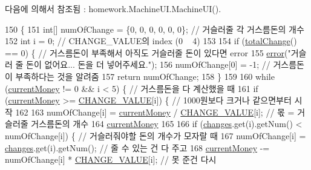 다음에 의해서 참조됨 \+:  homework.\+Machine\+U\+I.\+Machine\+U\+I().


\begin{DoxyCode}
150                                 \{
151         \textcolor{keywordtype}{int}[] numOfChange = \{0, 0, 0, 0, 0, 0\}; \textcolor{comment}{// 거슬러줄 각 거스름돈의 개수}
152         \textcolor{keywordtype}{int} i = 0; \textcolor{comment}{// CHANGE\_VALUE의 index (0 ~ 4)}
153         
154         \textcolor{keywordflow}{if} (\hyperlink{classhomework_1_1_machine_a6871460a79f45dda54336ec2a4554550}{totalChange}() == 0) \{ \textcolor{comment}{// 거스름돈이 부족해서 아직도 거슬러줄 돈이 있다면 error}
155             \hyperlink{classhomework_1_1_machine_a1d7f4ae53f4a73b94c1f7948637abe56}{error}(\textcolor{stringliteral}{"거슬러 줄 돈이 없어요... 돈을 더 넣어주세요."});
156             numOfChange[0] = -1; \textcolor{comment}{// 거스름돈이 부족하다는 것을 알려줌}
157             \textcolor{keywordflow}{return} numOfChange;
158         \}
159         
160         \textcolor{keywordflow}{while} (\hyperlink{classhomework_1_1_machine_a79f249f2701117b1e20977785536dad1}{currentMoney} != 0 && i < 5) \{ \textcolor{comment}{// 거스름돈을 다 계산했을 때}
161             \textcolor{keywordflow}{if} (\hyperlink{classhomework_1_1_machine_a79f249f2701117b1e20977785536dad1}{currentMoney} >= \hyperlink{classhomework_1_1_machine_ab52b84064804f444c66656c109a17ce0}{CHANGE\_VALUE}[i]) \{ \textcolor{comment}{// 1000원보다 크거나 같으면부터 시작}
162                 
163                 numOfChange[i] = \hyperlink{classhomework_1_1_machine_a79f249f2701117b1e20977785536dad1}{currentMoney} / \hyperlink{classhomework_1_1_machine_ab52b84064804f444c66656c109a17ce0}{CHANGE\_VALUE}[i]; \textcolor{comment}{// 몫 = 거슬러줄 거스름돈의
       개수}
164                 \hyperlink{classhomework_1_1_machine_a79f249f2701117b1e20977785536dad1}{currentMoney} %
165                 
166                 \textcolor{keywordflow}{if} (\hyperlink{classhomework_1_1_machine_a48e377022719ab86eb778519dfc46a32}{changes}.get(i).getNum() < numOfChange[i])    \{ \textcolor{comment}{// 거슬러줘야할 돈의 개수가 모자랄 때}
167                     numOfChange[i] = \hyperlink{classhomework_1_1_machine_a48e377022719ab86eb778519dfc46a32}{changes}.get(i).getNum(); \textcolor{comment}{// 줄 수 있는 건 다 주고}
168                     \hyperlink{classhomework_1_1_machine_a79f249f2701117b1e20977785536dad1}{currentMoney} -= numOfChange[i] * \hyperlink{classhomework_1_1_machine_ab52b84064804f444c66656c109a17ce0}{CHANGE\_VALUE}[i]; \textcolor{comment}{// 못 준건 다시
}
\end{DoxyCode}
